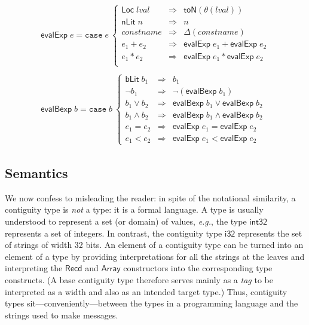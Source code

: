 \documentclass[sigplan,10pt,anonymous,review]{acmart}\settopmatter{printfolios=true,printccs=false,printacmref=false}
\newcommand{\eg}{\textit{e.g.}}
\newcommand{\konst}[1]{\ensuremath{\mathsf{#1}}}
\newcommand{\lval}{\ensuremath{\mathit{lval}}}
\begin{document}
\[
\begin{array}{l}
\konst{evalExp} \; e =
\mathtt{case}\; e\
 \left\{
 \begin{array}{lcl}
    \konst{Loc}\; \lval & \Rightarrow & \konst{toN}(\theta(\lval)) \\
    \konst{nLit}\; n & \Rightarrow & n  \\
    \mathit{constname} & \Rightarrow & \Delta(\mathit{constname})  \\
    e_1 + e_2 & \Rightarrow & \konst{evalExp}\; e_1 + \konst{evalExp}\; e_2  \\
    e_1 * e_2 & \Rightarrow & \konst{evalExp}\; e_1 * \konst{evalExp}\; e_2  \\
  \end{array}
 \right.
 \\ \\
\konst{evalBexp} \; b =
\mathtt{case}\; b\
 \left\{
 \begin{array}{lcl}
    \konst{bLit}\; b_1 & \Rightarrow & b_1 \\
    \neg b_1 & \Rightarrow & \neg(\konst{evalBexp} \; b_1)  \\
    b_1 \lor b_2 & \Rightarrow & \konst{evalBexp} \;b_1 \lor \konst{evalBexp} \;b_2   \\
    b_1 \land b_2 & \Rightarrow & \konst{evalBexp} \;b_1 \land \konst{evalBexp} \;b_2   \\
    e_1 = e_2 & \Rightarrow & \konst{evalExp} \;e_1 = \konst{evalExp} \;e_2   \\
    e_1 < e_2 & \Rightarrow & \konst{evalExp} \;e_1 < \konst{evalExp} \;e_2
  \end{array}
 \right.

\end{array}
\]


\subsection{Semantics}

 We now confess to misleading the reader: in spite of the notational
 similarity, a contiguity type is \emph{not} a type: it is a formal
 language. A type is usually understood to represent a set (or domain)
 of values, \eg, the type \konst{int32} represents a set of
 integers. In contrast, the contiguity type \konst{i32} represents the
 set of strings of width 32 bits. An element of a contiguity type can
 be turned into an element of a type by providing interpretations for
 all the strings at the leaves and interpreting the \konst{Recd} and
 \konst{Array} constructors into the corresponding type constructs. (A
 base contiguity type therefore serves mainly as a \emph{tag} to be
 interpreted as a width and also as an intended target type.) Thus,
 contiguity types sit---conveniently---between the types in a
 programming language and the strings used to make messages.
\end{document}
